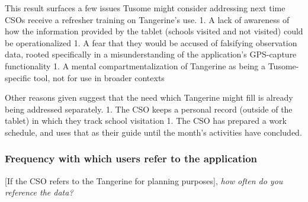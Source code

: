 \documentclass[11pt]{article}
\begin{document}
    This result surfaces a few issues Tusome might consider addressing next
time CSOs receive a refresher training on Tangerine's use. 1. A lack of
awareness of how the information provided by the tablet (schools visited
and not visited) could be operationalized 1. A fear that they would be
accused of falsifying observation data, rooted specifically in a
misunderstanding of the application's GPS-capture functionality 1. A
mental compartmentalization of Tangerine as being a Tusome-specific
tool, not for use in broader contexts

Other reasons given suggest that the need which Tangerine might fill is
already being addressed separately. 1. The CSO keeps a personal record
(outside of the tablet) in which they track school visitation 1. The CSO
has prepared a work schedule, and uses that as their guide until the
month's activities have concluded.

    \hypertarget{frequency-with-which-users-refer-to-the-application}{%
\subsubsection{Frequency with which users refer to the
application}\label{frequency-with-which-users-refer-to-the-application}}

{[}If the CSO refers to the Tangerine for planning purposes{]},
\emph{how often do you reference the data?}
\end{document}

